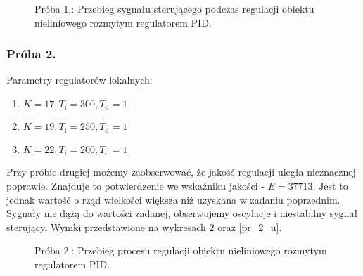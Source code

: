 \begin{figure}[b]
    \centering
    \caption{Próba 1.: Przebieg sygnału sterującego podczas regulacji obiektu nieliniowego rozmytym regulatorem PID.}
    \label{pr_1_u}
\end{figure}


\subsubsection{Próba 2.}
Parametry regulatorów lokalnych:
\begin{enumerate}
\item $K = 17, T_{\mathrm{i}} = 300,  T_{\mathrm{d}} = 1$
\item $K = 19, T_{\mathrm{i}} = 250,  T_{\mathrm{d}} = 1$
\item $K = 22, T_{\mathrm{i}} = 200,  T_{\mathrm{d}} = 1$
\end{enumerate}
Przy próbie drugiej możemy zaobserwować, że jakość regulacji uległa nieznacznej poprawie. Znajduje to potwierdzenie we wskaźniku jakości - $E = \num{37713}$. Jest to jednak wartość o rząd wielkości większa niż uzyskana w zadaniu poprzednim. Sygnały nie dążą do wartości zadanej, obserwujemy oscylacje i niestabilny sygnał sterujący. Wyniki przedstawione na wykresach \ref{pr_2_y} oraz \ref{pr_2_u}.

\begin{figure}[t]
    \centering
    \caption{Próba 2.: Przebieg procesu regulacji obiektu nieliniowego rozmytym regulatorem PID.}
    \label{pr_2_y}
\end{figure}

